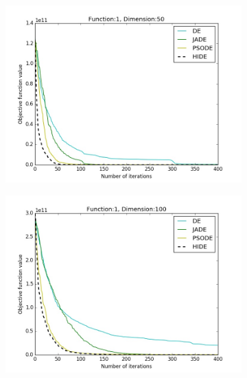 \documentclass[a4paper,twoside]{article}
\begin{document}
\begin{figure}[h!]
\begin{subfigure}[b]{0.24\textwidth}
        \includegraphics[width=\textwidth,natwidth=800,natheight=600]{plot_50D_F1_save}
        \caption{}
    \end{subfigure}
    \begin{subfigure}[b]{0.24\textwidth}
        \includegraphics[width=\textwidth,natwidth=800,natheight=600]{plot_100D_F1_save}
        \caption{}
    \end{subfigure}


\end{figure}
\end{document}

